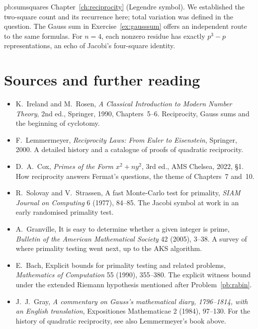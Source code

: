 \begin{solution}{pb:sumsquares}
\tools Chapter~\ref{ch:reciprocity} (Legendre symbol).
We established the two-square count and its recurrence here;
total variation was defined in the question.
\leads The Gauss sum in Exercise~\ref{ex:gausssum}
offers an independent route to the same formulas.
For $n=4$, each nonzero residue has exactly $p^3-p$
representations, an echo of Jacobi's four-square identity.
\end{solution}

\section*{Sources and further reading}

\begin{itemize}
\item K.~Ireland and M.~Rosen, \emph{A Classical Introduction to Modern Number Theory}, 2nd ed., Springer, 1990, Chapters~5--6. Reciprocity, Gauss sums and the beginning of cyclotomy.
\item F.~Lemmermeyer, \emph{Reciprocity Laws: From Euler to Eisenstein}, Springer, 2000. A detailed history and a catalogue of proofs of quadratic reciprocity.
\item D.~A.~Cox, \emph{Primes of the Form $x^2+ny^2$}, 3rd ed., AMS Chelsea, 2022, \S1. How reciprocity answers Fermat's questions, the theme of Chapters~7 and~10.
\item R.~Solovay and V.~Strassen, A fast Monte-Carlo test for primality, \emph{SIAM Journal on Computing} 6 (1977), 84--85. The Jacobi symbol at work in an early randomised primality test.
\item A.~Granville, It is easy to determine whether a given integer is prime, \emph{Bulletin of the American Mathematical Society} 42 (2005), 3--38. A survey of where primality testing went next, up to the AKS algorithm.
\item E.~Bach, Explicit bounds for primality testing and related problems, \emph{Mathematics of Computation} 55 (1990), 355--380. The explicit witness bound under the extended Riemann hypothesis mentioned after Problem~\ref{pb:rabin}.
\item J.~J.~Gray, \emph{A commentary on Gauss's mathematical diary, 1796--1814, with an English translation}, Expositiones Mathematicae 2 (1984), 97--130. For the history of quadratic reciprocity, see also Lemmermeyer's book above.
\end{itemize}
